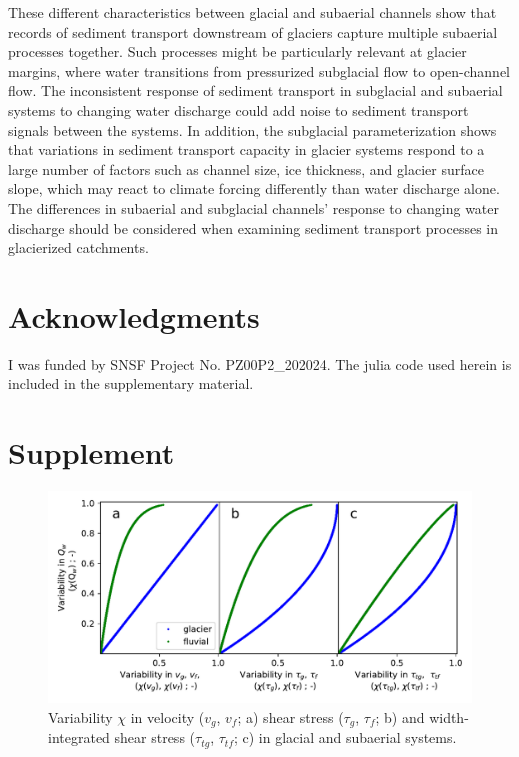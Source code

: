 \documentclass[11pt]{article}
\begin{document}
\begin{spacing}{1}
  These different characteristics between glacial and subaerial channels show that records of sediment transport downstream of glaciers capture multiple subaerial processes together.
  Such processes might be particularly relevant at glacier margins, where water transitions from pressurized subglacial flow to open-channel flow.
  The inconsistent response of sediment transport in subglacial and subaerial systems to changing water discharge could add noise to sediment transport signals between the systems.
  In addition, the subglacial parameterization shows that variations in sediment transport capacity in glacier systems respond to a large number of factors such as channel size, ice thickness, and glacier surface slope, which may react to climate forcing differently than water discharge alone. 
  The differences in subaerial and subglacial channels' response to changing water discharge should be considered when examining sediment transport processes in glacierized catchments.
  
  \section{Acknowledgments}
  
  I was funded by SNSF Project No. PZ00P2\_202024.
  The julia code used herein is included in the supplementary material.
  
  
\end{spacing}





\section{Supplement}

\begin{center}
  \begin{figure}[H]
    \includegraphics[width=0.7\linewidth]{multi_run_vars.pdf}
    \caption{Variability $\chi$ in velocity ($v_g$, $v_f$; a) shear stress ($\tau_g$, $\tau_f$; b) and width-integrated shear stress ($\tau_{tg}$, $\tau_{tf}$; c)  in glacial and subaerial systems. }
    \label{fig:gammas}
  \end{figure}
\end{center}
\end{document}

